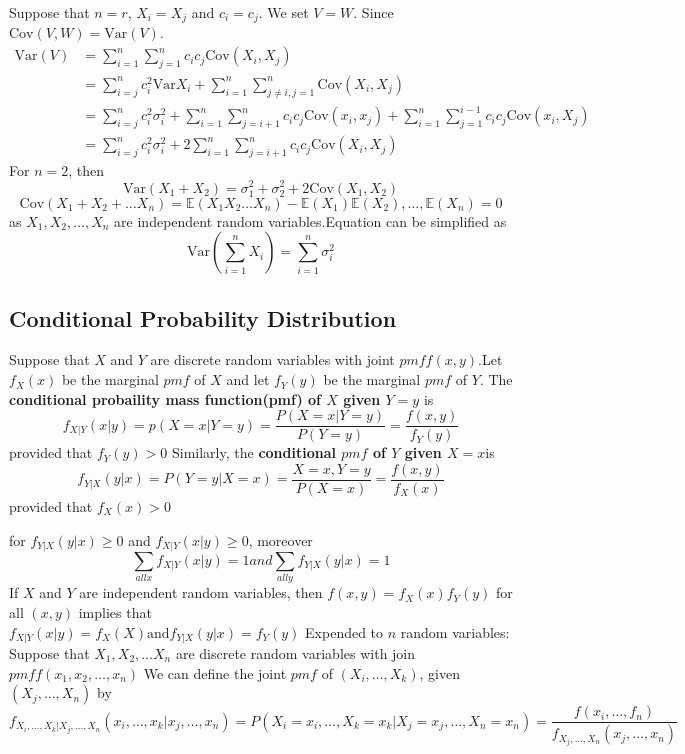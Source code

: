 \documentclass{article}
\newcommand{\E}{\mathbb{E}}
\newcommand{\Var}{\mathrm{Var}}
\newcommand{\Cov}{\mathrm{Cov}}
\begin{document}
\noindent Suppose that $n = r$, $X_{i} = X_{j}$ and $c_{i} = c_{j}$. We set $V = W$. Since $\Cov(V,W) = \Var(V)$.
\begin{align*}
    \Var(V) &= \sum_{i=1}^{n}\sum_{j=1}^{n}c_{i}c_{j}\Cov(X_{i}, X_{j}) \\
            &= \sum_{i=j}^{n}c_{i}^2\Var{X_{i}} + \sum_{i=1}^{n}\sum_{j \ne i, j=1}^{n}\Cov(X_{i}, X_{j})\\
            &= \sum_{i=j}^{n}c_{i}^2\sigma_{i}^2 + \sum_{i=1}^{n}\sum_{j=i+1}^{n}c_{i}c_{j}\Cov(x_{i}, x_{j}) + \sum_{i=1}^{n}\sum_{j=1}^{i-1}c_{i}c_{j}\Cov(x_{i}, X_{j}) \\
            &= \sum_{i=j}^{n}c_{i}^2\sigma_{i}^2 + 2\sum_{i=1}^{n}\sum_{j=i+1}^{n}c_{i}c_{j}\Cov(X_{i}, X_{j})
\end{align*}
For $n=2$, then
$$\Var(X_{1} + X_{2}) = \sigma_{1}^2 + \sigma_{2}^2 + 2\Cov(X_{1}, X_{2})$$
$$\Cov(X_{1} + X_{2} + \dotsc X_{n}) = \E(X_{1}X_{2}\dotsc X_{n}) - \E(X_1)\E(X_2), \dotsc, \E(X_n) = 0$$ as $X_1, X_2, \dotsc, X_n$ are independent random variables.Equation can be simplified as
$$\Var(\sum_{i=1}^{n}X_i) = \sum_{i=1}^{n}\sigma_{i}^2$$

\subsection{Conditional Probability Distribution}
Suppose that $X$ and $Y$ are discrete random variables with joint $pmf f(x,y)$.Let $f_X(x)$ be the marginal $pmf$ of $X$ and let $f_Y(y)$ be the marginal $pmf$ of $Y$. The \textbf{conditional probaility mass function(pmf) of $X$ given $Y = y$} is 
$$f_{X|Y}(x|y) = p(X=x|Y=y) = \frac{P(X=x|Y=y)}{P(Y=y)} = \frac{f(x,y)}{f_Y(y)}$$
provided that $f_Y(y) > 0$ Similarly, the \textbf{conditional $pmf$ of $Y$ given $X=x$}is
$$f_{Y|X}(y|x) = P(Y=y|X=x)=\frac{X=x, Y=y} {P(X=x)} = \frac{f(x,y)}{f_X(x)}$$
provided that $f_X(x) > 0$

\noindent for $f_{Y|X}(y|x) \ge 0$ and $f_{X|Y}(x|y) \ge 0$, moreover 
$$\sum_{all x}f_{X|Y}(x|y) = 1 and \sum_{all y}f_{Y|X}(y|x) = 1$$
If $X$ and $Y$ are independent random variables, then $f(x, y) = f_X(x)f_Y(y)$ for all $(x,y)$ implies that\\ $f_{X|Y}(x|y) = f_X(X) \text{and} f_{Y|X}(y|x) = f_Y(y)$
Expended to $n$ random variables: Suppose that  $X_1, X_2, \dotsc X_n$ are discrete random variables with join $pmf f(x_1, x_2, \dotsc, x_n)$ We can define the joint $pmf$ of $(X_i, \dotsc, X_k)$, given $(X_j, \dotsc, X_n)$ by 
$$f_{X_i, \dotsc, X_k|X_j, \dotsc, X_n}(x_i, \dotsc, x_k|x_j, \dotsc, x_n) = P(X_i = x_i, \dotsc, X_k = x_k|X_j=x_j, \dotsc, X_n=x_n) = \frac{f(x_i, \dotsc, f_n)}{f_{X_j, \dotsc, X_n}(x_j, \dotsc, x_n)}$$
\end{document}
